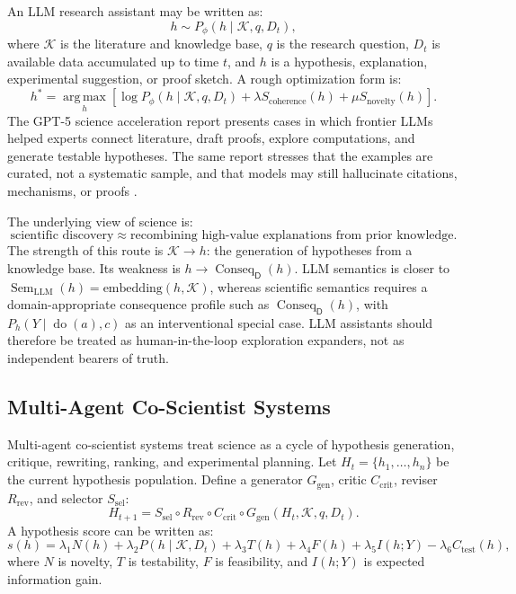\documentclass[11pt,a4paper]{article}
\newcommand{\doop}{\operatorname{do}}
\newcommand{\Sem}{\operatorname{Sem}}
\newcommand{\Conseq}{\operatorname{Conseq}}
\newcommand{\argmax}{\operatorname*{arg\,max}}
\newcommand{\Know}{\mathcal{K}}
\newcommand{\Dom}{\mathsf{D}}
\begin{document}
An LLM research assistant may be written as:
\begin{equation}
h\sim P_{\phi}(h\mid \Know,q,D_t),
\end{equation}
where $\Know$ is the literature and knowledge base, $q$ is the research question, $D_t$ is available data accumulated up to time $t$, and $h$ is a hypothesis, explanation, experimental suggestion, or proof sketch. A rough optimization form is:
\begin{equation}
h^\ast=\argmax_h
\left[
\log P_{\phi}(h\mid \Know,q,D_t)
+\lambda S_{\mathrm{coherence}}(h)
+\mu S_{\mathrm{novelty}}(h)
\right].
\end{equation}
The GPT-5 science acceleration report presents cases in which frontier LLMs helped experts connect literature, draft proofs, explore computations, and generate testable hypotheses. The same report stresses that the examples are curated, not a systematic sample, and that models may still hallucinate citations, mechanisms, or proofs \citep{Bubeck2025GPT5Science,OpenAI2025ScienceGPT5}.

The underlying view of science is:
\[
\boxed{\text{scientific discovery} \approx \text{recombining high-value explanations from prior knowledge}.}
\]
The strength of this route is $\Know\rightarrow h$: the generation of hypotheses from a knowledge base. Its weakness is $h\rightarrow \Conseq_{\Dom}(h)$. LLM semantics is closer to $\Sem_{\mathrm{LLM}}(h)=\mathrm{embedding}(h,\Know)$, whereas scientific semantics requires a domain-appropriate consequence profile such as $\Conseq_{\Dom}(h)$, with $P_h(Y\mid \doop(a),c)$ as an interventional special case. LLM assistants should therefore be treated as human-in-the-loop exploration expanders, not as independent bearers of truth.

\subsection{Multi-Agent Co-Scientist Systems}

Multi-agent co-scientist systems treat science as a cycle of hypothesis generation, critique, rewriting, ranking, and experimental planning. Let $H_t=\{h_1,\ldots,h_n\}$ be the current hypothesis population. Define a generator $G_{\mathrm{gen}}$, critic $C_{\mathrm{crit}}$, reviser $R_{\mathrm{rev}}$, and selector $S_{\mathrm{sel}}$:
\begin{equation}
H_{t+1}=S_{\mathrm{sel}}\circ R_{\mathrm{rev}}\circ C_{\mathrm{crit}}\circ G_{\mathrm{gen}}(H_t,\Know,q,D_t).
\end{equation}
A hypothesis score can be written as:
\begin{equation}
s(h)=
\lambda_1N(h)+\lambda_2P(h\mid \Know,D_t)+\lambda_3T(h)+
\lambda_4F(h)+\lambda_5I(h;Y)-\lambda_6C_{\mathrm{test}}(h),
\end{equation}
where $N$ is novelty, $T$ is testability, $F$ is feasibility, and $I(h;Y)$ is expected information gain.
\end{document}
